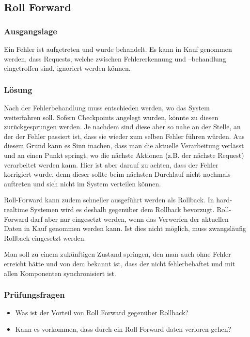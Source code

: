 \subsection{Roll Forward}


\subsubsection*{Ausgangslage}


Ein Fehler ist aufgetreten und wurde behandelt. Es kann in Kauf genommen werden, dass Requests, welche zwischen Fehlererkennung und –behandlung eingetroffen sind, ignoriert werden können.

\subsubsection*{Lösung}


Nach der Fehlerbehandlung muss entschieden werden, wo das System weiterfahren soll. Sofern Checkpoints angelegt wurden, könnte zu diesen zurückgesprungen werden. Je nachdem sind diese aber so nahe an der Stelle, an der der Fehler passiert ist, dass sie wieder zum selben Fehler führen würden. Aus diesem Grund kann es Sinn machen, dass man die aktuelle Verarbeitung verlässt und an einen Punkt springt, wo die nächste Aktionen (z.B. der nächste Request) verarbeitet werden kann. Hier ist aber darauf zu achten, dass der Fehler korrigiert wurde, denn dieser sollte beim nächsten Durchlauf nicht nochmals auftreten und sich nicht im System verteilen können.

Roll-Forward kann zudem schneller ausgeführt werden als Rollback. In hard-realtime Systemen wird es deshalb gegenüber dem Rollback bevorzugt. Roll-Forward darf aber nur eingesetzt werden, wenn das Verwerfen der aktuellen Daten in Kauf genommen werden kann. Ist dies nicht möglich, muss zwangsläufig Rollback eingesetzt werden.

Man soll zu einem zukünftigen Zustand springen, den man auch ohne Fehler erreicht hätte und von dem bekannt ist, dass der nicht fehlerbehaftet und mit allen Komponenten synchronisiert ist.

\subsubsection*{Prüfungsfragen}

\begin{itemize}
	\item Was ist der Vorteil von Roll Forward gegenüber Rollback?
	\item Kann es vorkommen, dass durch ein Roll Forward daten verloren gehen?
\end{itemize}

